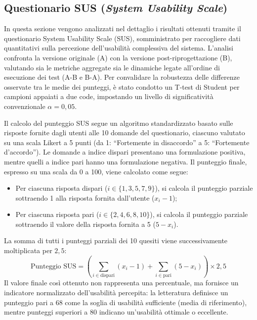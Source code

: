 \subsection{Questionario SUS (\textit{System Usability Scale})}
\label{subsec:questionario_SUS}

In questa sezione vengono analizzati nel dettaglio i risultati ottenuti tramite il questionario System Usability Scale (SUS), somministrato per raccogliere dati quantitativi sulla percezione dell'usabilità complessiva del sistema. L'analisi confronta la versione originale (A) con la versione post-riprogettazione (B), valutando sia le metriche aggregate sia le dinamiche legate all'ordine di esecuzione dei test (A-B e B-A). Per convalidare la robustezza delle differenze osservate tra le medie dei punteggi, è stato condotto un T-test di Student per campioni appaiati a due code, impostando un livello di significatività convenzionale $\alpha = 0{,}05$.

Il calcolo del punteggio SUS segue un algoritmo standardizzato basato sulle risposte fornite dagli utenti alle 10 domande del questionario, ciascuno valutato su una scala Likert a 5 punti (da 1: ``Fortemente in disaccordo'' a 5: ``Fortemente d'accordo''). Le domande a indice dispari presentano una formulazione positiva, mentre quelli a indice pari hanno una formulazione negativa. Il punteggio finale, espresso su una scala da 0 a 100, viene calcolato come segue:
\begin{itemize}
	\item Per ciascuna risposta dispari ($i \in \{1, 3, 5, 7, 9\}$), si calcola il punteggio parziale sottraendo 1 alla risposta fornita dall'utente ($x_i - 1$);
	\item Per ciascuna risposta pari ($i \in \{2, 4, 6, 8, 10\}$), si calcola il punteggio parziale sottraendo il valore della risposta fornita a 5 ($5 - x_i$).
\end{itemize}
La somma di tutti i punteggi parziali dei 10 quesiti viene successivamente moltiplicata per $2{,}5$:
\begin{equation}
	\text{Punteggio SUS} = \left( \sum_{i \in \text{dispari}} (x_i - 1) + \sum_{i \in \text{pari}} (5 - x_i) \right) \times 2{,}5
\end{equation}
Il valore finale così ottenuto non rappresenta una percentuale, ma fornisce un indicatore normalizzato dell'usabilità percepita: la letteratura definisce un punteggio pari a 68 come la soglia di usabilità sufficiente (media di riferimento), mentre punteggi superiori a 80 indicano un'usabilità ottimale o eccellente.

